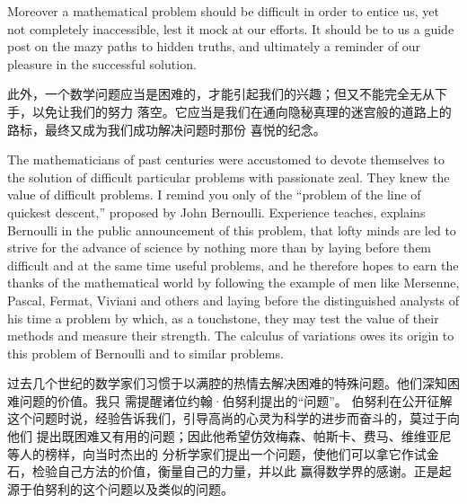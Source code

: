 \documentclass{mojing-translation}
\begin{document}
\begin{pairs}
\begin{original}
Moreover a mathematical problem should be difficult in order to entice us, yet not completely
inaccessible, lest it mock at our efforts. It should be to us a guide post on the mazy paths to
hidden truths, and ultimately a reminder of our pleasure in the successful solution.
\end{original}
\begin{translated}
此外，一个数学问题应当是困难的，才能引起我们的兴趣；但又不能完全无从下手，以免让我们的努力
落空。它应当是我们在通向隐秘真理的迷宫般的道路上的路标，最终又成为我们成功解决问题时那份
喜悦的纪念。
\end{translated}

\begin{original}
The mathematicians of past centuries were accustomed to devote themselves to the solution of
difficult particular problems with passionate zeal. They knew the value of difficult problems.
I remind you only of the ``problem of the line of quickest descent,'' proposed by John
Bernoulli. Experience teaches, explains Bernoulli in the public announcement of this problem,
that lofty minds are led to strive for the advance of science by nothing more than by laying
before them difficult and at the same time useful problems, and he therefore hopes to earn the
thanks of the mathematical world by following the example of men like Mersenne, Pascal, Fermat,
Viviani and others and laying before the distinguished analysts of his time a problem by which,
as a touchstone, they may test the value of their methods and measure their strength. The
calculus of variations owes its origin to this problem of Bernoulli and to similar problems.
\end{original}
\begin{translated}
过去几个世纪的数学家们习惯于以满腔的热情去解决困难的特殊问题。他们深知困难问题的价值。我只
需提醒诸位约翰·伯努利提出的“问题”。
伯努利在公开征解这个问题时说，经验告诉我们，引导高尚的心灵为科学的进步而奋斗的，莫过于向他们
提出既困难又有用的问题；因此他希望仿效梅森、帕斯卡、费马、维维亚尼等人的榜样，向当时杰出的
分析学家们提出一个问题，使他们可以拿它作试金石，检验自己方法的价值，衡量自己的力量，并以此
赢得数学界的感谢。正是起源于伯努利的这个问题以及类似的问题。
\end{translated}


\end{pairs}
\end{document}
